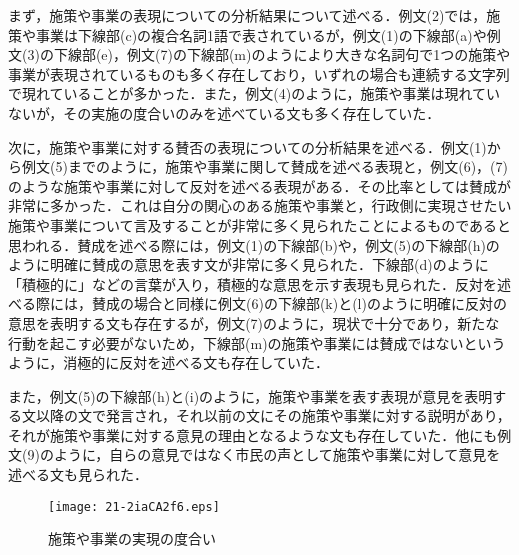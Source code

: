 \documentclass[japanese]{jnlp_1.4}
\begin{document}
まず，施策や事業の表現についての分析結果について述べる．例文(2)では，施策や事業は下線部(c)の複合名詞1語で表されているが，例文(1)の下線部(a)や例文(3)の下線部(e)，例文(7)の下線部(m)のようにより大きな名詞句で1つの施策や事業が表現されているものも多く存在しており，いずれの場合も連続する文字列で現れていることが多かった．また，例文(4)のように，施策や事業は現れていないが，その実施の度合いのみを述べている文も多く存在していた．

次に，施策や事業に対する賛否の表現についての分析結果を述べる．例文(1)から例文(5)までのように，施策や事業に関して賛成を述べる表現と，例文(6)，(7)のような施策や事業に対して反対を述べる表現がある．その比率としては賛成が非常に多かった．これは自分の関心のある施策や事業と，行政側に実現させたい施策や事業について言及することが非常に多く見られたことによるものであると思われる．賛成を述べる際には，例文(1)の下線部(b)や，例文(5)の下線部(h)のように明確に賛成の意思を表す文が非常に多く見られた．下線部(d)のように「積極的に」などの言葉が入り，積極的な意思を示す表現も見られた．反対を述べる際には，賛成の場合と同様に例文(6)の下線部(k)と(l)のように明確に反対の意思を表明する文も存在するが，例文(7)のように，現状で十分であり，新たな行動を起こす必要がないため，下線部(m)の施策や事業には賛成ではないというように，消極的に反対を述べる文も存在していた．

また，例文(5)の下線部(h)と(i)のように，施策や事業を表す表現が意見を表明する文以降の文で発言され，それ以前の文にその施策や事業に対する説明があり，それが施策や事業に対する意見の理由となるような文も存在していた．他にも例文(9)のように，自らの意見ではなく市民の声として施策や事業に対して意見を述べる文も見られた．

\begin{figure}[b]
 \begin{center}
 \texttt{[image: 21-2iaCA2f6.eps]}
 \end{center}
\caption{施策や事業の実現の度合い}
\label{fig:jit}
\end{figure}
\end{document}
